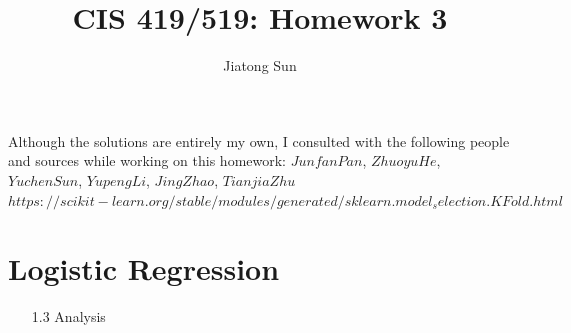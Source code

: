 \documentclass{article}
\title{CIS 419/519: Homework 3}
\author{Jiatong Sun}
\date{}
\begin{document}
    \maketitle
	Although the solutions are entirely my own, I consulted with the following people and sources while working on this homework: $Junfan Pan$, $Zhuoyu He$, $Yuchen Sun$, $Yupeng Li$, $Jing Zhao$, $Tianjia Zhu$\\ 
	$https://scikit-learn.org/stable/modules/generated/sklearn.model_selection.KFold.html$
    
    \section{Logistic Regression}
    	\begin{enumerate}
    	\item [1.3]Analysis
    	

\end{enumerate}
\end{document}
